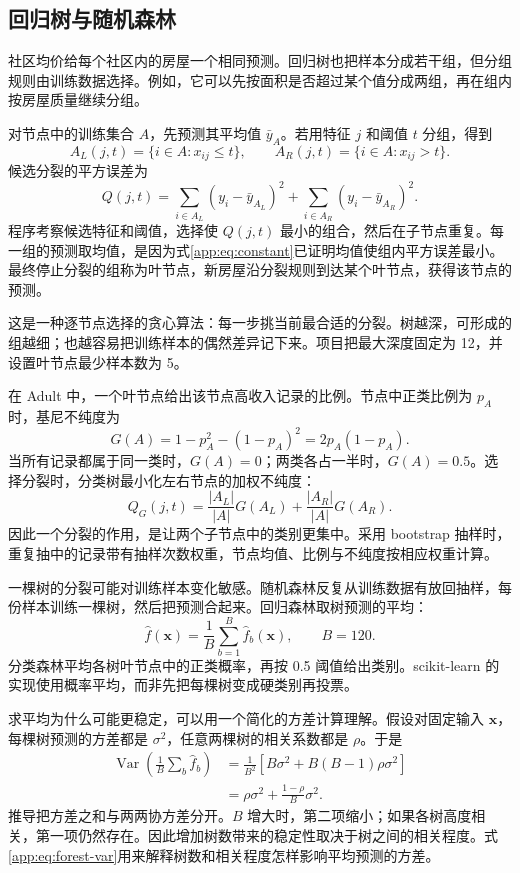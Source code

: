 \subsection{回归树与随机森林}
社区均价给每个社区内的房屋一个相同预测。回归树也把样本分成若干组，但分组规则由训练数据选择。例如，它可以先按面积是否超过某个值分成两组，再在组内按房屋质量继续分组。

对节点中的训练集合 $A$，先预测其平均值 $\bar y_A$。若用特征 $j$ 和阈值 $t$ 分组，得到
\[
A_L(j,t)=\{i\in A:x_{ij}\leq t\},\qquad
A_R(j,t)=\{i\in A:x_{ij}>t\}.
\]
候选分裂的平方误差为
\begin{equation}\label{app:eq:tree-split}
Q(j,t)=\sum_{i\in A_L}(y_i-\bar y_{A_L})^2
+\sum_{i\in A_R}(y_i-\bar y_{A_R})^2.
\end{equation}
程序考察候选特征和阈值，选择使 $Q(j,t)$ 最小的组合，然后在子节点重复。每一组的预测取均值，是因为式\eqref{app:eq:constant}已证明均值使组内平方误差最小。最终停止分裂的组称为叶节点，新房屋沿分裂规则到达某个叶节点，获得该节点的预测。

这是一种逐节点选择的贪心算法：每一步挑当前最合适的分裂。树越深，可形成的组越细；也越容易把训练样本的偶然差异记下来。项目把最大深度固定为 12，并设置叶节点最少样本数为 5\citep{sklearntree}。

在 Adult 中，一个叶节点给出该节点高收入记录的比例。节点中正类比例为 $p_A$ 时，基尼不纯度为
\begin{equation}
G(A)=1-p_A^2-(1-p_A)^2=2p_A(1-p_A).
\end{equation}
当所有记录都属于同一类时，$G(A)=0$；两类各占一半时，$G(A)=0.5$。选择分裂时，分类树最小化左右节点的加权不纯度：
\begin{equation}
Q_G(j,t)=\frac{|A_L|}{|A|}G(A_L)+\frac{|A_R|}{|A|}G(A_R).
\end{equation}
因此一个分裂的作用，是让两个子节点中的类别更集中。采用 bootstrap 抽样时，重复抽中的记录带有抽样次数权重，节点均值、比例与不纯度按相应权重计算。

一棵树的分裂可能对训练样本变化敏感。随机森林反复从训练数据有放回抽样，每份样本训练一棵树，然后把预测合起来。回归森林取树预测的平均：
\begin{equation}
\hat f(\mathbf x)=\frac1B\sum_{b=1}^{B}\hat f_b(\mathbf x),\qquad B=120.
\end{equation}
分类森林平均各树叶节点中的正类概率，再按 0.5 阈值给出类别。scikit-learn 的实现使用概率平均，而非先把每棵树变成硬类别再投票\citep{sklearnforestclass}。

求平均为什么可能更稳定，可以用一个简化的方差计算理解。假设对固定输入 $\mathbf x$，每棵树预测的方差都是 $\sigma^2$，任意两棵树的相关系数都是 $\rho$。于是
\begin{align}
\operatorname{Var}\left(\frac1B\sum_b\hat f_b\right)
&=\frac1{B^2}\left[B\sigma^2+B(B-1)\rho\sigma^2\right]\\
&=\rho\sigma^2+\frac{1-\rho}{B}\sigma^2.\label{app:eq:forest-var}
\end{align}
推导把方差之和与两两协方差分开。$B$ 增大时，第二项缩小；如果各树高度相关，第一项仍然存在。因此增加树数带来的稳定性取决于树之间的相关程度。式\eqref{app:eq:forest-var}用来解释树数和相关程度怎样影响平均预测的方差。

